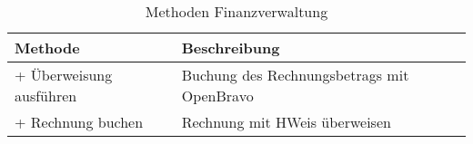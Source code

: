 \begin{table}[ht!]
\centering
\caption{Methoden Finanzverwaltung}
\label{tab:MethodenFinanzverwaltung}
\begin{tabularx}{\linewidth}{@{}lX@{}}
\toprule
Methode                 & Beschreibung              \\ \midrule
+ Überweisung ausführen & Buchung des Rechnungsbetrags mit OpenBravo  \\
+ Rechnung buchen & Rechnung mit HWeis überweisen  \\ \bottomrule
\end{tabularx}
\end{table}

